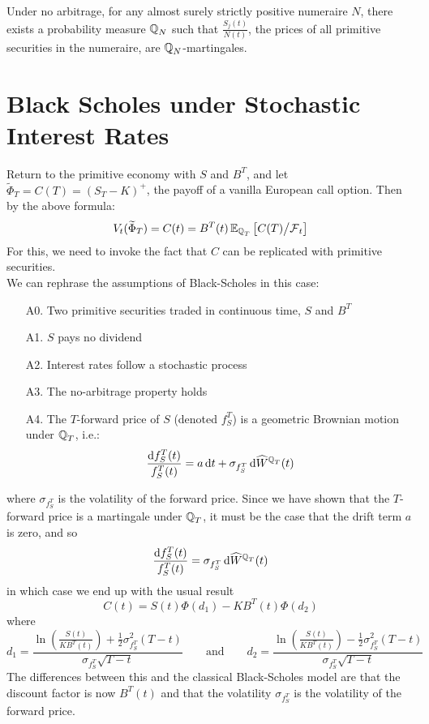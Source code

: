 \documentclass[11pt]{article}
\begin{document}
\begin{theorem}
Under no arbitrage, for any almost surely strictly positive numeraire $N$, there exists a probability measure $\operatorname{\mathbb Q}_N$ such that $\frac{S_j(t)}{N(t)}$, the prices of all primitive securities in the numeraire, are $\operatorname{\mathbb Q}_N$-martingales.
\end{theorem}

\section{Black Scholes under Stochastic Interest Rates}
Return to the primitive economy with $S$ and $B^T$, and let $\widetilde{\Phi}_T = C(T) = (S_T - K)^+$, the payoff of a vanilla European call option. Then by the above formula: 
$$ V_t(\widetilde{\Phi}_T) = C(t) = B^T(t) \operatorname{\mathbb E}_{\operatorname{\mathbb Q}_T} \left[ C(T) \middle/ \operatorname{\mathcal F}_t \right]$$
For this, we need to invoke the fact that $C$ can be replicated with primitive securities. \\

We can rephrase the assumptions of Black-Scholes in this case:
\begin{enumerate}
\item[A0.] Two primitive securities traded in continuous time, $S$ and $B^T$
\item[A1.] $S$ pays no dividend
\item[A2.] Interest rates follow a stochastic process
\item[A3.] The no-arbitrage property holds
\item[A4.] The $T$-forward price of $S$ (denoted $f_S^T$) is a geometric Brownian motion under $\operatorname{\mathbb Q}_T$, i.e.:
$$ \frac{\dif f_S^T(t)}{f_S^T(t)} = a \dif t + \sigma_{f_S^T} \dif \widehat{W}^{\Qmeas_T}(t)$$
\end{enumerate}
where $\sigma_{f_S^T}$ is the volatility of the forward price. Since we have shown that the $T$-forward price is a martingale under $\operatorname{\mathbb Q}_T$, it must be the case that the drift term $a$ is zero, and so
$$ \frac{\dif f_S^T(t)}{f_S^T(t)} = \sigma_{f_S^T} \dif \widehat{W}^{\Qmeas_T}(t)$$
in which case we end up with the usual result
$$ C(t) = S(t) \Phi(d_1) - K B^T(t) \Phi(d_2)$$
where
$$d_1 = \frac{\ln \left( \frac{S(t)}{K B^T(t)}\right) + \frac{1}{2}\sigma_{f_S^T}^2(T-t)}{\sigma_{f_S^T} \sqrt{T-t}} \qquad \text{and} \qquad d_2 = \frac{\ln \left( \frac{S(t)}{K B^T(t)}\right) - \frac{1}{2}\sigma_{f_S^T}^2(T-t)}{\sigma_{f_S^T} \sqrt{T-t}}$$
The differences between this and the classical Black-Scholes model are that the discount factor is now $B^T(t)$ and that the volatility $\sigma_{f_S^T}$ is the volatility of the forward price. 
\end{document}
